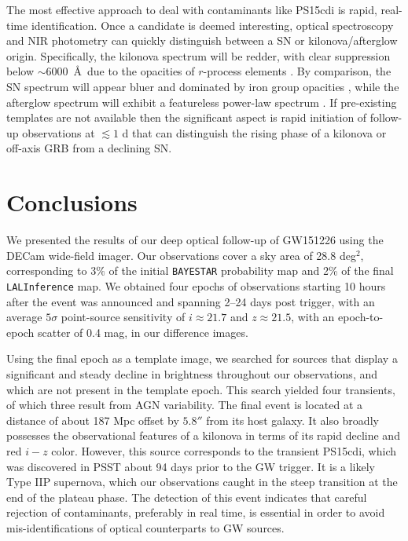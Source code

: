 \clearpage
The most effective approach to deal with contaminants like PS15cdi is rapid, real-time identification. Once a candidate is deemed interesting, optical spectroscopy and  NIR photometry can quickly distinguish between a SN or kilonova/afterglow origin. Specifically, the kilonova spectrum will be redder, with clear suppression below $\sim 6000$~\AA~due to the opacities of $r$-process elements \citep{Kasen+13}. By comparison, the SN spectrum will appear bluer and dominated by iron group opacities \citep{Kasen+13}, while the afterglow spectrum will exhibit a featureless power-law spectrum \citep{Berger2014}. If pre-existing templates are not available then the significant aspect is rapid initiation of follow-up observations at $\lesssim 1$ d that can distinguish the rising phase of a kilonova or  off-axis GRB from a declining SN.

\section{Conclusions}
\label{sec:ch4_conc}
We presented the results of our deep optical follow-up of  GW151226 using the DECam wide-field imager. Our observations cover a sky area of 28.8 deg$^2$, corresponding to $3\%$ of the initial {\tt BAYESTAR} probability map and 2\% of the final {\tt LALInference} map. We obtained four epochs of observations starting 10 hours after the  event was announced and spanning 2--24 days post trigger, with an average $5\sigma$ point-source sensitivity of  $i\approx21.7$ and $z\approx21.5$, with an epoch-to-epoch scatter of 0.4 mag, in our difference images.

Using the final epoch as a template image, we searched for sources that display a significant and steady decline in brightness throughout our observations, and which are not present in the template epoch. This search yielded four transients, of which three result from AGN variability. The final event is located at a distance of about 187 Mpc offset by $5.8''$ from its host galaxy. It also broadly possesses the observational features of a kilonova in terms of its rapid decline and red $i-z$ color. However, this source corresponds to the transient PS15cdi, which was discovered in PSST about 94 days prior to the GW trigger. It is a likely Type IIP supernova, which our observations caught in the steep transition at the end of the plateau phase. The detection of this event indicates that careful rejection of contaminants, preferably in real time, is essential in order to avoid mis-identifications of optical counterparts to GW sources.
